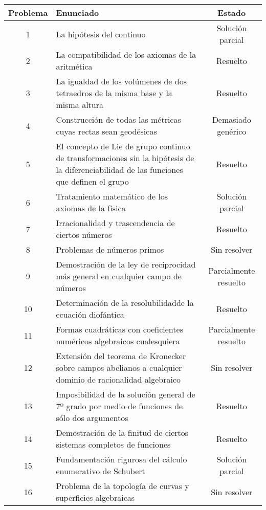 \begin{longtable}{|c|p{7cm}|c|} \toprule
  \centering
    Problema & Enunciado & Estado \\ \midrule \midrule
    1 & La hipótesis del continuo & Solución parcial \\ \midrule 
    2 & La compatibilidad de los axiomas de la aritmética & Resuelto \\ \midrule 
    3 & La igualdad de los volúmenes de dos 
        tetraedros de la misma base y la misma altura & Resuelto \\ \midrule 
    4 & Construcción de todas las métricas cuyas rectas sean geodésicas & Demasiado genérico \\ \midrule
    5 & El concepto de Lie de grupo continuo de transformaciones sin 
        la hipótesis de la diferenciabilidad de las funciones que 
        definen el grupo & Resuelto \\ \midrule
    6 & Tratamiento matemático de los axiomas de la física & Solución parcial \\ \midrule
    7 & Irracionalidad y trascendencia de ciertos números & Resuelto \\ \midrule
    8 & Problemas de números primos & Sin resolver \\ \midrule
    9 & Demostración de la ley de reciprocidad más 
        general en cualquier campo de números & Parcialmente resuelto \\ \midrule
    10 & Determinación de la resolubilidadde la ecuación diofántica & Resuelto \\ \midrule
    11 & Formas cuadráticas con coeficientes numéricos 
        algebraicos cualesquiera & Parcialmente resuelto \\ \midrule
    12 & Extensión del teorema de Kronecker sobre campos abelianos 
        a cualquier dominio de racionalidad algebraico & Sin resolver \\ \midrule
    13 & Imposibilidad de la solución general de 7º
        grado por medio de funciones de sólo dos argumentos & Resuelto \\ \midrule
    14 & Demostración de la finitud de ciertos sistemas completos de funciones & Resuelto \\ \midrule
    15 & Fundamentación rigurosa del cálculo enumerativo de Schubert & Solución parcial\\ \midrule
    16 & Problema de la topología de curvas y superficies algebraicas & Sin resolver \\ \midrule

\end{longtable}
